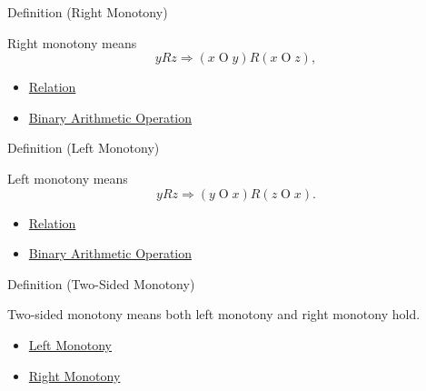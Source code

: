 \begin{definitionbox}{Definition (Right Monotony)}
\begin{definition}
\label{def:right-monotony}
Right monotony means
\[
yRz \Longrightarrow (x\mathbin{O}y)R(x\mathbin{O}z),
\]
\end{definition}
\end{definitionbox}

\begin{dependencies}
\begin{itemize}
  \item \hyperref[def:relation]{Relation}
  \item \hyperref[def:binary-arithmetic-operation]{Binary Arithmetic Operation}
\end{itemize}
\end{dependencies}

\begin{definitionbox}{Definition (Left Monotony)}
\begin{definition}
\label{def:left-monotony}
Left monotony means
\[
yRz \Longrightarrow (y\mathbin{O}x)R(z\mathbin{O}x).
\]
\end{definition}
\end{definitionbox}

\begin{dependencies}
\begin{itemize}
  \item \hyperref[def:relation]{Relation}
  \item \hyperref[def:binary-arithmetic-operation]{Binary Arithmetic Operation}
\end{itemize}
\end{dependencies}

\begin{definitionbox}{Definition (Two-Sided Monotony)}
\begin{definition}
\label{def:two-sided-monotony}
Two-sided monotony means both left monotony and right monotony hold.
\end{definition}
\end{definitionbox}

\begin{dependencies}
\begin{itemize}
  \item \hyperref[def:left-monotony]{Left Monotony}
  \item \hyperref[def:right-monotony]{Right Monotony}
\end{itemize}
\end{dependencies}

